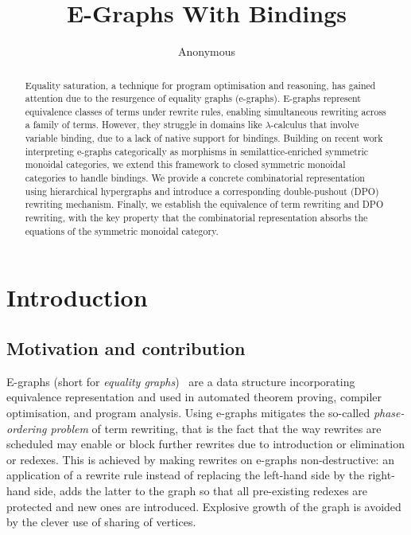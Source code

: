 \documentclass[]{IEEEtran}
\begin{document}
\title{E-Graphs With Bindings
}


\author{Anonymous}

\maketitle

\begin{abstract}
    Equality saturation, a technique for program optimisation and reasoning, has gained attention due to the resurgence of equality graphs (e-graphs). 
	E-graphs represent equivalence classes of terms under rewrite rules, enabling simultaneous rewriting across a family of terms. 
	However, they struggle in domains like $\lambda$-calculus that involve variable binding, due to a lack of native support for bindings.
	Building on recent work interpreting e-graphs categorically as morphisms in semilattice-enriched symmetric monoidal categories, we extend this framework to closed symmetric monoidal categories to handle bindings. 
	We provide a concrete combinatorial representation using hierarchical hypergraphs and introduce a corresponding double-pushout (DPO) rewriting mechanism. 
	Finally, we establish the equivalence of term rewriting and DPO rewriting, with the key property that the combinatorial representation absorbs the equations of the symmetric monoidal category.
\end{abstract}

\section{Introduction}
\label{sec:introduction}

\subsection{Motivation and contribution}

E-graphs (short for \emph{equality graphs})~\cite{EggPaper} are a data structure incorporating equivalence representation and used in automated theorem proving, compiler optimisation, and program analysis. 
Using e-graphs mitigates the so-called \emph{phase-ordering problem} of term rewriting, that is the fact that the way rewrites are scheduled may enable or block further rewrites due to introduction or elimination or redexes. 
This is achieved by making rewrites on e-graphs non-destructive: an application of a rewrite rule instead of replacing the left-hand side by the right-hand side, adds the latter to the graph so that all pre-existing redexes are protected and new ones are introduced. 
Explosive growth of the graph is avoided by the clever use of sharing of vertices. 
\end{document}
